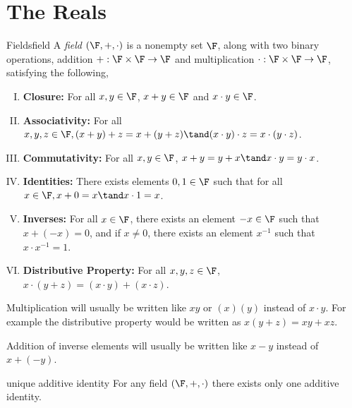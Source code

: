 \documentclass{report}
\begin{document}
\chapter{The Reals}

\begin{definition}{Fields}{field}
  A \emph{field} $\left(\F, +, \cdot\right)$ is a nonempty set $\F$, along with two binary operations,
  addition $+: \F \times \F \rightarrow \F$
  and multiplication $\cdot: \F \times \F \rightarrow \F$, satisfying the following,

  \begin{enumerate}[I.]
    \item \textbf{Closure:} For all $x, y \in \F$, $x + y \in \F$ and $x \cdot y \in \F$.
    \item \textbf{Associativity:} For all $x, y, z \in \F, (x + y) + z = x + (y + z) \tand (x \cdot y) \cdot z = x \cdot (y \cdot z)$.
    \item \textbf{Commutativity:} For all $x, y \in \F$, $x + y = y + x \tand x \cdot y = y \cdot x$.
    \item \textbf{Identities:} There exists elements $0, 1 \in \F$ such that for all $x \in \F, x + 0 = x \tand x \cdot 1 = x$.
    \item \textbf{Inverses:} For all $x \in \F$, there exists an element $-x \in \F$ such that $x + (-x) = 0$, and if $x \neq 0$, there exists an element $x^{-1}$ such that $x \cdot x^{-1} = 1$.
    \item \textbf{Distributive Property:} For all $x, y, z \in \F$, $x \cdot (y + z) = (x \cdot y) + (x \cdot z)$.
  \end{enumerate}
\end{definition}

\begin{notation}{}{}
  Multiplication will usually be written like $xy$ or $(x)(y)$ instead of $x \cdot y$.
  For example the distributive property would be written as $x(y + z) = xy + xz$.
\end{notation}

\begin{notation}{}{}
  Addition of inverse elements will usually be written like $x - y$ instead of $x + (-y)$.
\end{notation}

\begin{lemma}{unique additive identity}{}
  For any field $\left(\F, +, \cdot\right)$ there exists only one additive identity.
\end{lemma}
\end{document}
